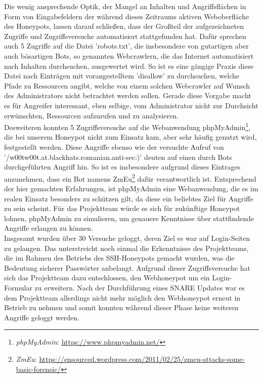 Die wenig ansprechende Optik, der Mangel an Inhalten und Angriffsflächen in Form von Eingabefeldern der während dieses Zeitraums aktiven Weboberfläche des Honeypots, lassen darauf schließen, dass der Großteil der aufgezeichneten Zugriffe und Zugriffsversuche automatisiert stattgefunden hat. Dafür sprechen auch 5 Zugriffe auf die Datei 'robots.txt', die insbesondere von gutartigen aber auch bösartigen Bots, so genannten Webcrawlern, die das Internet automatisiert nach Inhalten durchsuchen, ausgewertet wird. So ist es eine gängige Praxis diese Datei nach Einträgen mit vorangestelltem 'disallow' zu durchsuchen, welche Pfade zu Ressourcen angibt, welche von einem solchen Webcrawler auf Wunsch des Administrators nicht betrachtet werden sollen. Gerade diese Vorgabe macht es für Angreifer interessant, eben selbige, vom Administrator nicht zur Durchsicht erwünschten, Ressourcen aufzurufen und zu analysieren.\\ 

Desweiteren konnten 5 Zugriffsversuche auf die Webanwendung phpMyAdmin\footnote{ \textit{phpMyAdmin}: \url{https://www.phpmyadmin.net/}}, die bei unserem Honeypot nicht zum Einsatz kam, aber sehr häufig genutzt wird, festgestellt werden. Diese Angriffe ebenso wie der versuchte Aufruf von '/w00tw00t.at.blackhats.romanian.anti-sec:)' deuten auf einen durch Bots durchgeführten Angriff hin. So ist es insbesondere aufgrund dieses Eintrages anzunehmen, dass ein Bot namens ZmEu\footnote{ \textit{ZmEu}: \url{https://ensourced.wordpress.com/2011/02/25/zmeu-attacks-some-basic-forensic/}} dafür verantwortlich ist. Entsprechend der hier gemachten Erfahrungen, ist phpMyAdmin eine Webanwendung, die es im realen Einsatz besonders zu schützen gilt, da diese ein beliebtes Ziel für Angriffe zu sein scheint. Für das Projektteam würde es sich für zukünftige Honeypot lohnen, phpMyAdmin zu simulieren, um genauere Kenntnisse über stattfindende Angriffe erlangen zu können.\\

Insgesamt wurden über 30 Versuche geloggt, deren Ziel es war auf Login-Seiten zu gelangen. Das unterstreicht noch einmal die Erkenntnisse des Projektteams, die im Rahmen des Betriebs des SSH-Honeypots gemacht wurden, was die Bedeutung sicherer Passwörter anbelangt. Aufgrund dieser Zugriffsversuche hat sich das Projektteam dazu entschlossen, den Webhoneypot um ein Login-Formular zu erweitern. 
Nach der Durchführung eines SNARE Updates war es dem Projektteam allerdings nicht mehr möglich den Webhoneypot erneut in Betrieb zu nehmen und somit konnten während dieser Phase keine weiteren Angriffe geloggt werden.\\

